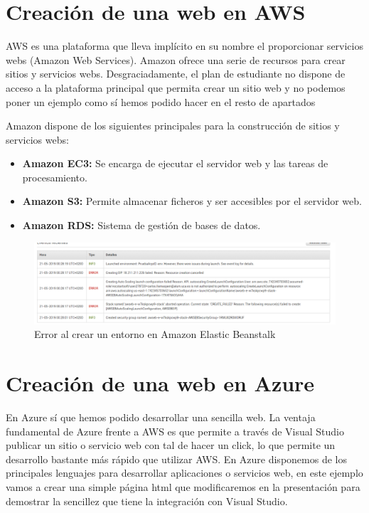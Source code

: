 \section{Creación de una web en AWS}
AWS es una plataforma que lleva implícito en su nombre el proporcionar servicios webs (Amazon Web Services). Amazon ofrece una serie de recursos para crear sitios y servicios webs. Desgraciadamente, el plan de estudiante no dispone de acceso a la plataforma principal que permita crear un sitio web y no podemos poner un ejemplo como sí hemos podido hacer en el resto de apartados

Amazon dispone de los siguientes principales para la construcción de sitios y servicios webs:
\begin{itemize}
	\item \textbf{Amazon EC3:} Se encarga de ejecutar el servidor web y las tareas de procesamiento.
	\item \textbf{Amazon S3:} Permite almacenar ficheros y ser accesibles por el servidor web.
	\item \textbf{Amazon RDS:} Sistema de gestión de bases de datos.
\end{itemize}

\begin{figure}[h]
	\centering
	\includegraphics[scale=0.45]{ImagenesAWS/Web/error_aws.png}
	\caption{Error al crear un entorno en Amazon Elastic Beanstalk}
	\label{AWSWEB1}
\end{figure}

\section{Creación de una web en Azure}
En Azure sí que hemos podido desarrollar una sencilla web. La ventaja fundamental de Azure frente a AWS es que permite a través de Visual Studio publicar un sitio o servicio web con tal de hacer un click, lo que permite un desarrollo bastante más rápido que utilizar AWS. En Azure disponemos de los principales lenguajes para desarrollar aplicaciones o servicios web, en este ejemplo vamos a crear una simple página html que modificaremos en la presentación para demostrar la sencillez que tiene la integración con Visual Studio.

